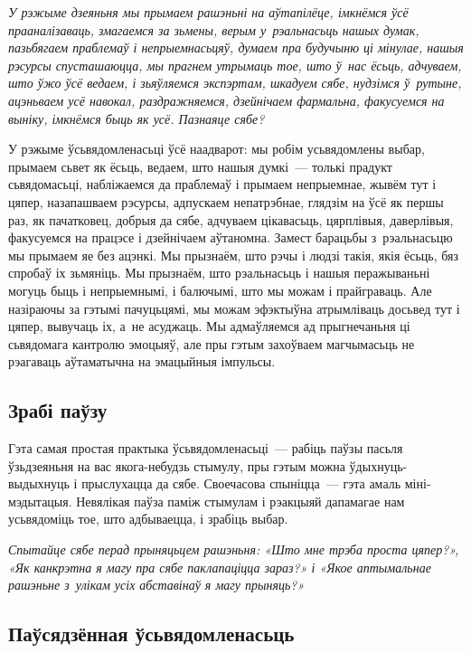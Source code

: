 
\emph{У рэжыме дзеяньня мы прымаем рашэньні на аўтапілёце, імкнёмся ўсё прааналізаваць, змагаемся за зьмены, верым у~рэальнасьць нашых думак, пазьбягаем праблемаў і непрыемнасьцяў, думаем пра будучыню ці мінулае, нашыя рэсурсы спусташаюцца, мы прагнем утрымаць тое, што ў~нас ёсьць, адчуваем, што ўжо ўсё ведаем, і зьяўляемся экспэртам, шкадуем сябе, нудзімся ў~рутыне, ацэньваем усё навокал, раздражняемся, дзейнічаем фармальна, факусуемся на выніку, імкнёмся быць як усё. Пазнаяце сябе?}

У рэжыме ўсьвядомленасьці ўсё наадварот: мы робім усьвядомлены выбар, прымаем сьвет як ёсьць, ведаем, што нашыя думкі~--- толькі прадукт сьвядомасьці, набліжаемся да праблемаў і прымаем непрыемнае, жывём тут і цяпер, назапашваем рэсурсы, адпускаем непатрэбнае, глядзім на ўсё як першы раз, як пачатковец, добрыя да сябе, адчуваем цікавасьць, цярплівыя, даверлівыя, факусуемся на працэсе і дзейнічаем аўтаномна. Замест барацьбы з~рэальнасьцю мы прымаем яе без ацэнкі. Мы прызнаём, што рэчы і людзі такія, якія ёсьць, бяз спробаў іх зьмяніць. Мы прызнаём, што рэальнасьць і нашыя перажываньні могуць быць і непрыемнымі, і балючымі, што мы можам і прайграваць. Але назіраючы за гэтымі пачуцьцямі, мы можам эфэктыўна атрымліваць досьвед тут і цяпер, вывучаць іх, а~не асуджаць. Мы адмаўляемся ад прыгнечаньня ці сьвядомага кантролю эмоцыяў, але пры гэтым захоўваем магчымасьць не рэагаваць аўтаматычна на эмацыйныя імпульсы.

\subsection*{Зрабі паўзу}

Гэта самая простая практыка ўсьвядомленасьці~--- рабіць паўзы пасьля ўзьдзеяньня на вас якога-небудзь стымулу, пры гэтым можна ўдыхнуць-выдыхнуць і прыслухацца да сябе. Своечасова спыніцца~--- гэта амаль міні-мэдытацыя. Невялікая паўза паміж стымулам і рэакцыяй дапамагае нам усьвядоміць тое, што адбываецца, і зрабіць выбар.

\emph{Спытайце сябе перад прыняцьцем рашэньня: «Што мне трэба проста цяпер?», «Як канкрэтна я магу пра сябе паклапаціцца зараз?» і «Якое аптымальнае рашэньне з~улікам усіх абставінаў я магу прыняць?»}

\subsection*{Паўсядзённая ўсьвядомленасьць}

